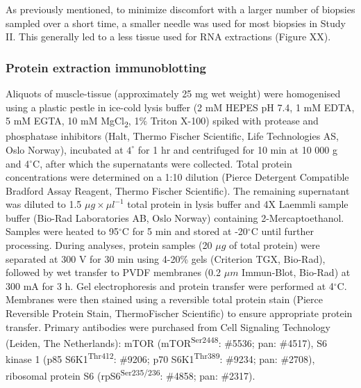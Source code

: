 \documentclass[twoside,10pt]{gihclass} %
\begin{document}
As previously mentioned, to minimize discomfort with a larger number of biopsies sampled over a short time, a smaller needle was used for most biopsies in Study II. This generally led to a less tissue used for RNA extractions (Figure XX).

\hypertarget{protein-extraction-immunoblotting}{%
\subsubsection{Protein extraction immunoblotting}\label{protein-extraction-immunoblotting}}

Aliquots of muscle-tissue (approximately 25 mg wet weight) were homogenised using a plastic pestle in ice-cold lysis buffer (2 mM HEPES pH 7.4, 1 mM EDTA, 5 mM EGTA, 10 mM MgCl\textsubscript{2}, 1\(\%\) Triton X-100) spiked with protease and phosphatase inhibitors (Halt, Thermo Fischer Scientific, Life Technologies AS, Oslo Norway), incubated at \(4^{\circ}\) for 1 hr and centrifuged for 10 min at 10 000 g and 4\(^{\circ}\)C, after which the supernatants were collected.
Total protein concentrations were determined on a 1:10 dilution (Pierce Detergent Compatible Bradford Assay Reagent, Thermo Fischer Scientific). The remaining supernatant was diluted to 1.5 \(\mu g \times \mu l^{-1}\) total protein in lysis buffer and 4X Laemmli sample buffer (Bio-Rad Laboratories AB, Oslo Norway) containing 2-Mercaptoethanol.
Samples were heated to 95\(^{\circ}\)C for 5 min and stored at -20\(^{\circ}\)C until further processing.
During analyses, protein samples (20 \(\mu g\) of total protein) were separated at 300 V for 30 min using 4-20\% gels (Criterion TGX, Bio-Rad), followed by wet transfer to PVDF membranes (0.2 \(\mu m\) Immun-Blot, Bio-Rad) at 300 mA for 3 h.
Gel electrophoresis and protein transfer were performed at 4\(^{\circ}\)C.
Membranes were then stained using a reversible total protein stain (Pierce Reversible Protein Stain, ThermoFischer Scientific) to ensure appropriate protein transfer.
Primary antibodies were purchased from Cell Signaling Technology (Leiden, The Netherlands): mTOR (mTOR\textsuperscript{Ser2448}: \#5536; pan: \#4517), S6 kinase 1 (p85 S6K1\textsuperscript{Thr412}: \#9206; p70 S6K1\textsuperscript{Thr389}: \#9234; pan: \#2708), ribosomal protein S6 (rpS6\textsuperscript{Ser235/236}: \#4858; pan: \#2317).
\end{document}
